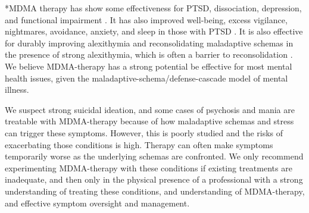 \documentclass[12pt,letterpaper]{article}
\begin{document}
*MDMA therapy has show some effectiveness for PTSD, dissociation, depression, and functional impairment \cite{greenMeta}. It has also improved well-being, excess vigilance, nightmares, avoidance, anxiety, and sleep in those with PTSD \cite{smithSystematic}. It is also effective for durably improving alexithymia and reconsolidating maladaptive schemas in the presence of strong alexithymia, which is often a barrier to reconsolidation \cite{vanSelfExperience}. We believe MDMA-therapy has a strong potential be effective for most mental health issues, given the maladaptive-schema/defense-cascade model of mental illness. 

We suspect strong suicidal ideation, and some cases of psychosis and mania are treatable with MDMA-therapy because of how maladaptive schemas and stress can trigger these symptoms. However, this is poorly studied and the risks of exacerbating those conditions is high. Therapy can often make symptoms temporarily worse as the underlying schemas are confronted. We only recommend experimenting MDMA-therapy with these conditions if existing treatments are inadequate, and then only in the physical presence of a professional with a strong understanding of treating these conditions, and understanding of MDMA-therapy, and effective symptom oversight and management.
\end{document}

